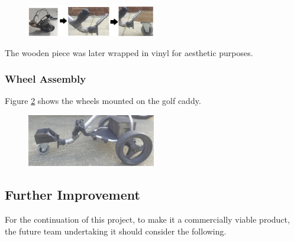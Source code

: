 \documentclass[11pt,landscape]{article}
\begin{document}
\begin{multicols}{2}
    \begin{figure}[H]
        \begin{center}
            \includegraphics[width=0.5\textwidth]{Figure28.jpg}
            \label{fig:castor}
        \end{center}
    \end{figure}
    The wooden piece was later wrapped in vinyl for aesthetic purposes.
    
    
    \subsubsection{Wheel Assembly}
    Figure \ref{fig:sprayed} shows the wheels mounted on the golf caddy. 
    
    \begin{figure}[H]
        \begin{center}
            \includegraphics[width=0.5\textwidth]{Figure29.jpg}
            \label{fig:sprayed}
        \end{center}
    \end{figure}
    
    
    \subsection{Further Improvement}
    
    For the continuation of this project, to make it a commercially viable
    product, the future team undertaking it should consider the following.
    

\end{multicols}
\end{document}
